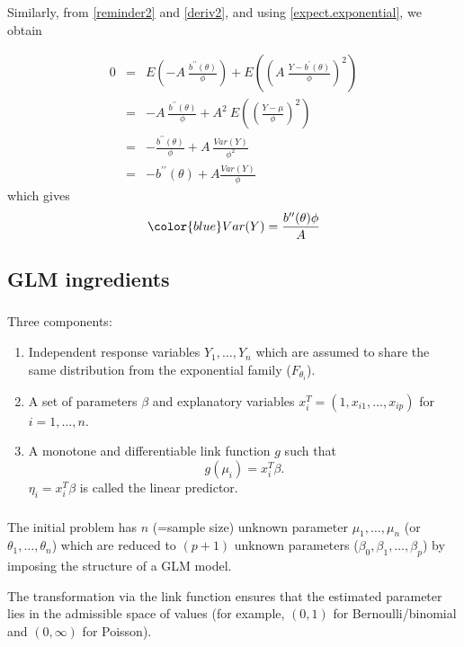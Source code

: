 \documentclass{beamer}
\newcommand{\bs}{\bigskip}
\begin{document}
\begin{frame}
\frametitle{}

Similarly, from \eqref{reminder2} and \eqref{deriv2}, and using
\eqref{expect.exponential}, we obtain

\begin{eqnarray*}
0 & = & E\left(- A \ \frac{b^{\prime \prime}(\theta)}{\phi}\right) +   E\left(
\left( A \ \frac{Y - b^{\prime}(\theta)}{\phi}\right)^2\right)\\
 & = &  - A \ \frac{b^{\prime \prime}(\theta)}{\phi} + A^2  \ E\left(
\left( \frac{Y - \mu}{\phi}\right)^2\right)\\
 & = & - \frac{b^{\prime \prime}(\theta)}{\phi} + A \ \frac{Var(Y)}{\phi^2}\\
 & = & - b^{\prime \prime}(\theta) + A \frac{Var(Y)}{\phi}
\end{eqnarray*}
\bs
which gives
\begin{equation}
\label{var.exponential}
{\color{blue}Var(Y) = \frac{b^{\prime \prime}(\theta)\phi}{ A}}
\end{equation}
\end{frame}

\subsection{GLM ingredients}

\begin{frame}
\frametitle{}

{\color{blue}Three components}:

\begin{enumerate}
\item Independent response variables $Y_1, \ldots,Y_n$ which are assumed to share
  the same distribution from the exponential family ($F_{\theta_i}$).
\item A set of parameters $\beta$ and explanatory variables $x_i^T = (1,
x_{i1},  \ldots, x_{ip})$ for $i=1,\ldots,n$.
\item A monotone and differentiable link function $g$ such that
$$g(\mu_i) = x_i^T  \beta.$$
$\eta_i = x_i^T \beta$ is called the linear predictor.
\end{enumerate}

\end{frame}

\begin{frame}
\frametitle{}

The initial problem has $n$ (=sample size) unknown parameter $\mu_1,
\ldots,\mu_n$ (or $\theta_1, \ldots, \theta_n$) which are reduced to $(p+1)$
unknown parameters ($\beta_0, \beta_1,\ldots,\beta_p$) by imposing the structure
of a GLM model.

\bs
\bs

The transformation via the link function ensures that the
estimated parameter lies in the admissible space of values
(for example, $(0,1)$ for Bernoulli/binomial and $(0, \infty)$ for Poisson).
\end{frame}
\end{document}
